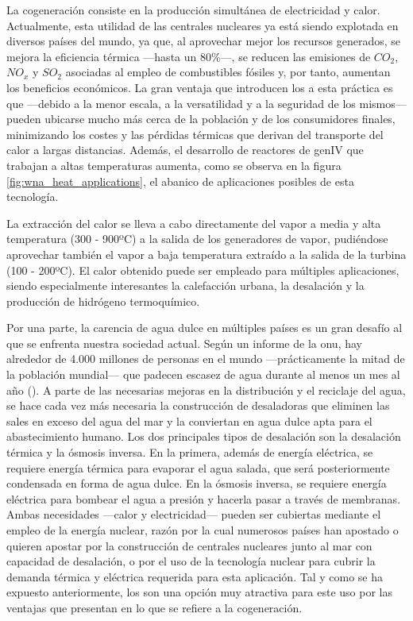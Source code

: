 La cogeneración consiste en la producción simultánea de electricidad y calor. Actualmente, esta utilidad de las centrales nucleares ya está siendo explotada en diversos países del mundo, ya que, al aprovechar mejor los recursos generados, se mejora la eficiencia térmica ---hasta un 80\%---, se reducen las emisiones de $CO_2$, $NO_x$ y $SO_2$ asociadas al empleo de combustibles fósiles y, por tanto, aumentan los beneficios económicos. La gran ventaja que introducen los  a esta práctica es que ---debido a la menor escala, a la versatilidad y a la seguridad de los mismos--- pueden ubicarse mucho más cerca de la población y de los consumidores finales, minimizando los costes y las pérdidas térmicas que derivan del transporte del calor a largas distancias. Además, el desarrollo de reactores de \acrshort{genIV} que trabajan a altas temperaturas aumenta, como se observa en la figura \ref{fig:wna_heat_applications}, el abanico de aplicaciones posibles de esta tecnología.

La extracción del calor se lleva a cabo directamente del vapor a media y alta temperatura (300 - 900ºC) a la salida de los generadores de vapor, pudiéndose aprovechar también el vapor a baja temperatura extraído a la salida de la turbina (100 - 200ºC). El calor obtenido puede ser empleado para múltiples aplicaciones, siendo especialmente interesantes la calefacción urbana, la desalación y la producción de hidrógeno termoquímico. 

Por una parte, la carencia de agua dulce en múltiples países es un gran desafío al que se enfrenta nuestra sociedad actual. Según un informe de la \acrshort{onu}, hay alrededor de 4.000 millones de personas en el mundo ---prácticamente la mitad de la población mundial--- que padecen escasez de agua durante al menos un mes al año (\cite{onu_agua}). A parte de las necesarias mejoras en la distribución y el reciclaje del agua, se hace cada vez más necesaria la construcción de desaladoras que eliminen las sales en exceso del agua del mar y la conviertan en agua dulce apta para el abastecimiento humano. Los dos principales tipos de desalación son la desalación térmica y la ósmosis inversa. En la primera, además de energía eléctrica, se requiere energía térmica para evaporar el agua salada, que será posteriormente condensada en forma de agua dulce. En la ósmosis inversa, se requiere energía eléctrica para bombear el agua a presión y hacerla pasar a través de membranas. Ambas necesidades ---calor y electricidad--- pueden ser cubiertas mediante el empleo de la energía nuclear, razón por la cual numerosos países han apostado  o quieren apostar por la construcción de centrales nucleares junto al mar con capacidad de desalación, o por el uso de la tecnología nuclear para cubrir la demanda térmica y eléctrica requerida para esta aplicación. Tal y como se ha expuesto anteriormente, los  son una opción muy atractiva para este uso por las ventajas que presentan en lo que se refiere a la cogeneración.

